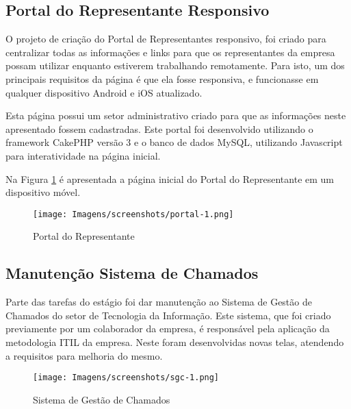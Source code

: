 \subsection{Portal do Representante Responsivo}

O projeto de criação do Portal de Representantes responsivo, foi criado para centralizar todas as informações e links para que os representantes da empresa possam utilizar enquanto estiverem trabalhando remotamente. Para isto, um dos principais requisitos da página é que ela fosse responsiva, e funcionasse em qualquer dispositivo Android e iOS atualizado. 

Esta página possui um setor administrativo criado para que as informações neste apresentado fossem cadastradas. Este portal foi desenvolvido utilizando o framework CakePHP versão 3 e o banco de dados MySQL, utilizando Javascript para interatividade na página inicial.

Na Figura \ref{fig:portalrep-1} é apresentada a página inicial do Portal do Representante em um dispositivo móvel.

\begin{figure}[htbp!]
  \centering
  \texttt{[image: Imagens/screenshots/portal-1.png]}
  \caption[Portal do Representante]{Portal do Representante}
  \label{fig:portalrep-1}
\end{figure}



\subsection{Manutenção Sistema de Chamados}

Parte das tarefas do estágio foi dar manutenção ao Sistema de Gestão de Chamados do setor de Tecnologia da Informação. Este sistema, que foi criado previamente por um colaborador da empresa, é responsável pela aplicação da metodologia ITIL da empresa. Neste foram desenvolvidas novas telas, atendendo a requisitos para melhoria do mesmo.

\begin{figure}[htbp!]
  \centering
  \texttt{[image: Imagens/screenshots/sgc-1.png]}
  \caption[Sistema de Gestão de Chamados]{Sistema de Gestão de Chamados}
  \label{fig:sgc-1}
\end{figure}
